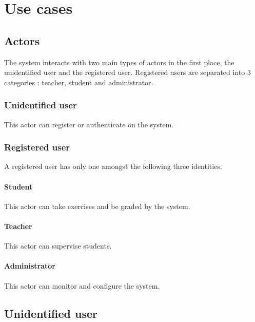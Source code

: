 \chapter{Use cases}
\section{Actors}
	The system interacts with two main types of actors in the first place, the unidentified user and the registered user.
	Registered users are separated into 3 categories : teacher, student and administrator.
	\subsection{Unidentified user}
		This actor can register or authenticate on the system.
	\subsection{Registered user}
		A registered user has only one amongst the following three identities.
		\subsubsection{Student}
			This actor can take exercises and be graded by the system.
		\subsubsection{Teacher}
			This actor can supervise students.
		\subsubsection{Administrator}
			This actor can monitor and configure the system.
\newpage
\section{Unidentified user}
